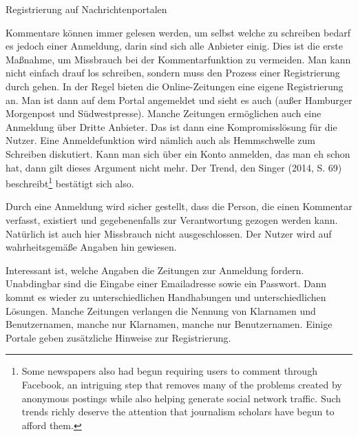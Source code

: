 Registrierung auf Nachrichtenportalen

Kommentare können immer gelesen werden, um selbst welche zu schreiben bedarf es
jedoch einer Anmeldung, darin sind sich alle Anbieter einig. Dies ist die erste
Maßnahme, um Missbrauch bei der Kommentarfunktion zu vermeiden. Man kann nicht
einfach drauf los schreiben, sondern muss den Prozess einer Registrierung durch
gehen. In der Regel bieten die Online-Zeitungen eine eigene Registrierung an.
Man ist dann auf dem Portal angemeldet und sieht es auch (außer Hamburger
Morgenpost und Südwestpresse). Manche Zeitungen ermöglichen auch eine Anmeldung
über Dritte Anbieter. Das ist dann eine Kompromisslösung für die Nutzer. Eine
Anmeldefunktion wird nämlich auch als Hemmschwelle zum Schreiben diskutiert.
Kann man sich über ein Konto anmelden, das man eh schon hat, dann gilt dieses
Argument nicht mehr. Der Trend, den Singer (2014, S. 69)
beschreibt\footnote{\glqq Some newspapers also had begun requiring users to
comment through Facebook, an intriguing step that removes many of the problems
created by anonymous postings while also helping generate social network
traffic. Such trends richly deserve the attention that journalism scholars have
begun to afford them.\grqq} bestätigt sich also.

Durch eine Anmeldung wird sicher gestellt, dass die Person, die einen Kommentar
verfasst, existiert und gegebenenfalls zur Verantwortung gezogen werden kann.
Natürlich ist auch hier Missbrauch nicht ausgeschlossen. Der Nutzer wird auf
wahrheitsgemäße Angaben hin gewiesen. 

Interessant ist, welche Angaben die Zeitungen zur Anmeldung fordern. Unabdingbar
sind die Eingabe einer Emailadresse sowie ein Passwort. Dann kommt es wieder zu
unterschiedlichen Handhabungen und unterschiedlichen Lösungen. Manche Zeitungen
verlangen die Nennung von Klarnamen und Benutzernamen, manche nur Klarnamen,
manche nur Benutzernamen. Einige Portale geben zusätzliche Hinweise zur
Registrierung. 


